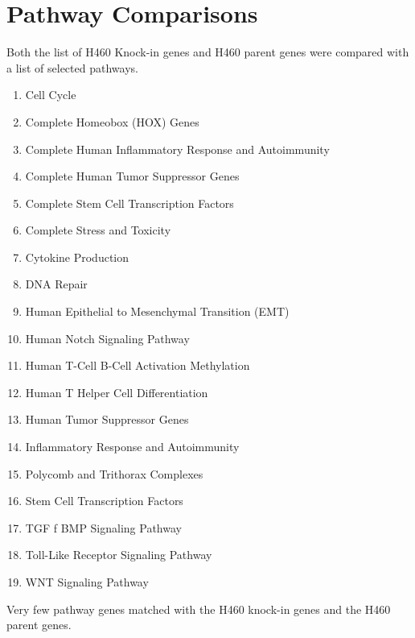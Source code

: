 \documentclass[11pt]{article}
\begin{document}
\newpage


\section*{Pathway Comparisons}

Both the list of H460 Knock-in genes and H460 parent genes were compared with a list of selected pathways.

\begin{enumerate}[itemsep=-0.2mm]
\item Cell Cycle                                 
\item Complete Homeobox (HOX) Genes                      
\item Complete Human Inflammatory Response and Autoimmunity 
\item Complete Human Tumor Suppressor Genes              
\item Complete Stem Cell Transcription Factors            
\item Complete Stress and Toxicity                         
\item Cytokine Production                                
\item DNA Repair 
\item Human Epithelial to Mesenchymal Transition (EMT)    
\item Human Notch Signaling Pathway                      
\item Human T-Cell B-Cell Activation Methylation         
\item Human T Helper Cell Differentiation                
\item Human Tumor Suppressor Genes                        
\item Inflammatory Response and Autoimmunity               
\item Polycomb and Trithorax Complexes                     
\item Stem Cell Transcription Factors                    
\item TGF f BMP Signaling Pathway                          
\item Toll-Like Receptor Signaling Pathway               
\item WNT Signaling Pathway                              
\end{enumerate}

Very few pathway genes matched with the H460 knock-in genes and the H460 parent genes. 
\end{document}
